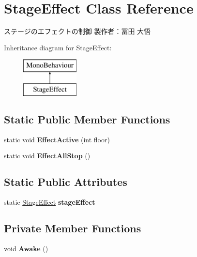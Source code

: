 \hypertarget{class_stage_effect}{}\section{Stage\+Effect Class Reference}
\label{class_stage_effect}


ステージのエフェクトの制御 製作者：冨田 大悟  


Inheritance diagram for Stage\+Effect\+:\begin{figure}[H]
\begin{center}
\leavevmode
\includegraphics[height=2.000000cm]{class_stage_effect}
\end{center}
\end{figure}
\subsection*{Static Public Member Functions}
\begin{DoxyCompactItemize}
\item 
\mbox{\label{class_stage_effect_ab253adfb6dce6fa0c7eeabfb58f0cfe2}} 
static void {\bfseries Effect\+Active} (int floor)
\item 
\mbox{\label{class_stage_effect_a0851ac25755e2768beec9f320c50a08d}} 
static void {\bfseries Effect\+All\+Stop} ()
\end{DoxyCompactItemize}
\subsection*{Static Public Attributes}
\begin{DoxyCompactItemize}
\item 
\mbox{\label{class_stage_effect_a9010ff3f04b11278719f088bb1992a36}} 
static \hyperlink{class_stage_effect}{Stage\+Effect} {\bfseries stage\+Effect}
\end{DoxyCompactItemize}
\subsection*{Private Member Functions}
\begin{DoxyCompactItemize}
\item 
\mbox{\label{class_stage_effect_ada9e0d04d896f36c757619613dc8eed1}} 
void {\bfseries Awake} ()
\end{DoxyCompactItemize}
